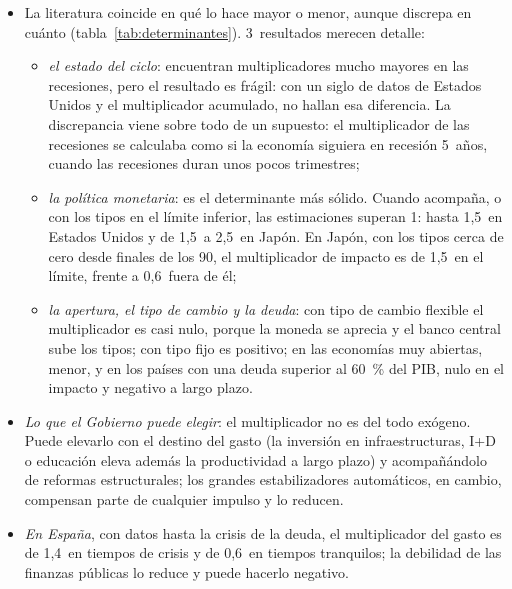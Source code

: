 \documentclass[11pt]{article}
\begin{document}
\begin{itemize}
\item La literatura coincide en qué lo hace mayor o menor, aunque discrepa en cuánto (tabla~\ref{tab:determinantes}). 3~resultados merecen detalle:
  \begin{itemize}
  \item \emph{el estado del ciclo}: \textcite{AuerbachGorodnichenko2012} encuentran multiplicadores mucho mayores en las recesiones, pero el resultado es frágil: con un siglo de datos de Estados Unidos y el multiplicador acumulado, \textcite{RameyZubairy2018} no hallan esa diferencia. La discrepancia viene sobre todo de un supuesto: el multiplicador de las recesiones se calculaba como si la economía siguiera en recesión 5~años, cuando las recesiones duran unos pocos trimestres;
  \item \emph{la política monetaria}: es el determinante más sólido. Cuando acompaña, o con los tipos en el límite inferior, las estimaciones superan 1: hasta 1,5~en Estados Unidos y de 1,5~a 2,5~en Japón\nocite{Ramey2019Ten}. En Japón, con los tipos cerca de cero desde finales de los 90, el multiplicador de impacto es de 1,5~en el límite, frente a 0,6~fuera de él\nocite{MiyamotoNguyenSergeyev2018};
  \item \emph{la apertura, el tipo de cambio y la deuda}: con tipo de cambio flexible el multiplicador es casi nulo, porque la moneda se aprecia y el banco central sube los tipos; con tipo fijo es positivo; en las economías muy abiertas, menor, y en los países con una deuda superior al 60~\% del PIB, nulo en el impacto y negativo a largo plazo\nocite{IlzetzkiMendozaVegh2013}.
  \end{itemize}
\item \emph{Lo que el Gobierno puede elegir}: el multiplicador no es del todo exógeno. Puede elevarlo con el destino del gasto (la inversión en infraestructuras, I+D o educación eleva además la productividad a largo plazo) y acompañándolo de reformas estructurales; los grandes estabilizadores automáticos, en cambio, compensan parte de cualquier impulso y lo reducen.
\item \emph{En España}, con datos hasta la crisis de la deuda, el multiplicador del gasto es de 1,4~en tiempos de crisis y de 0,6~en tiempos tranquilos; la debilidad de las finanzas públicas lo reduce y puede hacerlo negativo\nocite{HernandezDeCosMoralBenito2013}.
\end{itemize}
\end{document}
